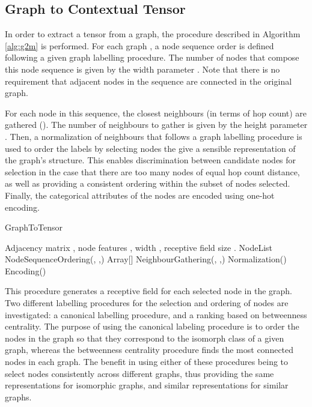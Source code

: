 \documentclass[conference]{IEEEtran}
\begin{document}
\subsection{Graph to Contextual Tensor}

In order to extract a tensor from a graph, the procedure described in Algorithm \ref{alg:g2m} is performed.
For each graph , a node sequence order is defined following a given graph labelling procedure. The number of nodes that compose this node sequence is given by the width parameter . Note that there is no requirement that adjacent nodes in the sequence are connected in the original graph.

For each node in this sequence, the closest neighbours (in terms of hop count) are gathered (). The number of neighbours to gather is given by the height parameter .
Then, a normalization of neighbours that follows a graph labelling procedure is used to order the labels by selecting nodes the give a sensible representation of the graph's structure. This enables discrimination between candidate nodes for selection in the case that there are too many nodes of equal hop count distance, as well as providing a consistent ordering within the subset of nodes selected. Finally, the categorical attributes of the nodes are encoded using one-hot encoding.



\begin{algorithm}[tb]
   \caption{GraphToTensor}
   \label{alg:g2m}
\begin{algorithmic}
     Adjacency matrix , node features , width , receptive field size .
    \STATE NodeList  NodeSequenceOrdering(, ,)
    \STATE  Array[]
        \STATE   NeighbourGathering(, ,)
        \STATE   Normalization()
        \STATE 
   \ENDFOR
   \STATE  Encoding()
\ENDFOR
\end{algorithmic}
\end{algorithm}


This procedure generates a receptive field for each selected node in the graph.
Two different labelling procedures for the selection and ordering of nodes are investigated: a canonical labelling procedure, and a ranking based on betweenness centrality.
The purpose of using the canonical labeling procedure is to order the nodes in the graph so that they correspond to the isomorph class of a given graph, whereas the betweenness centrality procedure finds the most connected nodes in each graph. The benefit in using either of these procedures being to select nodes consistently across different graphs, thus providing the same representations for isomorphic graphs, and similar representations for similar graphs.
\end{document}
